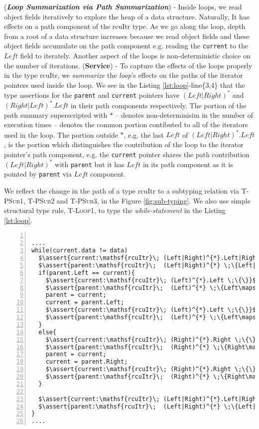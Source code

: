 (\textit{\textbf{Loop Summarization via Path Summarization}}) - Inside loops, we read object fields iteratively to explore the heap of a data structure. Naturally, It has effects on a path component of the \textsf{rcuItr} type. As we go along the loop, depth from a root of a data structure increases because we read object fields and these object fields accumulate on the path component e.g. reading the \texttt{current} to the $Left$ field to iterately. Another aspect of the loops is non-deterministic choice on the number of iterations. (\textbf{Service}) - To capture the effects of the loops properly in the type \textsf{rcuItr}, we \textit{summarize} the \textit{loop}'s effects on the paths of the iterator pointers used inside the loop. We see in the Listing \ref{lst:loop}-line\{3,4\} that the type assertions for the \texttt{parent} and \texttt{current} pointers have $(Left|Right)^{*}$ and $(Right|Left)^{*}.Left$ in their path components respectively. The portion of the path summary superscripted with $*$ -- denotes non-determinisim in the number of execution times -- denotes the common portion contibuted to all of the iterators used in the loop. The portion outside $*$, e.g. the last $Left$ of $(Left|Right)^{*}.Left$, is the portion which distinguishes the contribution of the loop to the iterator pointer's path component, e.g. the \texttt{current} pointer shares the path contribution $(Left|Right)^{*}$ with \texttt{parent} but it has $Left$ in its path component as it is pointed by \texttt{parent} via $Left$ component.

We reflect the change in the path of a type \textsf{rcuItr} to a subtyping relation via \textsc{T-PSub1}, \textsc{T-PSub2} and \textsc{T-PSub3}, in the Figure \ref{fig:sub-typing}. We also use simple structural type rule, \textsc{T-Loop1}, to type the \textit{while-statement} in the Listing \ref{lst:loop}.
\begin{lstlisting}[caption={Loop summarization via path summarization },label={lst:loop}, numbers=left, numberstyle=\tiny\color{red}, numbersep=5pt]%, basicstyle=\scriptsize]

....
while(current.data != data)
  $\assert{current:\mathsf{rcuItr}\; (Left|Right)^{*}.Left|Right \;\{\}}$
  $\assert{parent:\mathsf{rcuItr}\;  (Left|Right)^{*} \;\{Left|Right\mapsto current\}}$
  if(parent.Left == current){
    $\assert{current:\mathsf{rcuItr}\; (Left)^{*}.Left \;\{\}}$
    $\assert{parent:\mathsf{rcuItr}\;  (Left)^{*} \;\{Left\mapsto current\}}$
    parent = current;
    current = parent.Left;
    $\assert{current:\mathsf{rcuItr}\; (Left)^{*}.Left \;\{\}}$
    $\assert{parent:\mathsf{rcuItr}\;  (Left)^{*} \;\{Left\mapsto current\}}$
  }
  else{
    $\assert{current:\mathsf{rcuItr}\; (Right)^{*}.Right \;\{\}}$
    $\assert{parent:\mathsf{rcuItr}\;  (Right)^{*} \;\{Right\mapsto current\}}$
    parent = current;
    current = parent.Right;
    $\assert{current:\mathsf{rcuItr}\; (Right)^{*}.Right \;\{\}}$
    $\assert{parent:\mathsf{rcuItr}\;  (Right)^{*} \;\{Right\mapsto current\}}$
  }

  $\assert{current:\mathsf{rcuItr}\; (Left|Right)^{*}.Left|Right \;\{\}}$
  $\assert{parent:\mathsf{rcuItr}\;  (Left|Right)^{*} \;\{Left|Right\mapsto current\}}$
}
....
\end{lstlisting}

